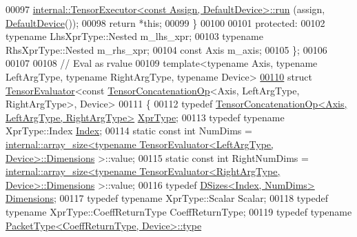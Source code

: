 \begin{DoxyCode}
00097       \hyperlink{class_eigen_1_1internal_1_1_tensor_executor}{internal::TensorExecutor<const Assign, DefaultDevice>::run}
      (assign, \hyperlink{struct_eigen_1_1_default_device}{DefaultDevice}());
00098       \textcolor{keywordflow}{return} *\textcolor{keyword}{this};
00099     \}
00100 
00101   \textcolor{keyword}{protected}:
00102     \textcolor{keyword}{typename} LhsXprType::Nested m\_lhs\_xpr;
00103     \textcolor{keyword}{typename} RhsXprType::Nested m\_rhs\_xpr;
00104     \textcolor{keyword}{const} Axis m\_axis;
00105 \};
00106 
00107 
00108 \textcolor{comment}{// Eval as rvalue}
00109 \textcolor{keyword}{template}<\textcolor{keyword}{typename} Axis, \textcolor{keyword}{typename} LeftArgType, \textcolor{keyword}{typename} RightArgType, \textcolor{keyword}{typename} Device>
\hyperlink{struct_eigen_1_1_tensor_evaluator_3_01const_01_tensor_concatenation_op_3_01_axis_00_01_left_arg_e37e1b61d31098a96aab7c22793b325c}{00110} \textcolor{keyword}{struct }\hyperlink{struct_eigen_1_1_tensor_evaluator}{TensorEvaluator}<const \hyperlink{class_eigen_1_1_tensor_concatenation_op}{TensorConcatenationOp}<Axis, LeftArgType, 
      RightArgType>, Device>
00111 \{
00112   \textcolor{keyword}{typedef} \hyperlink{class_eigen_1_1_tensor_concatenation_op}{TensorConcatenationOp<Axis, LeftArgType, RightArgType>}
       \hyperlink{class_eigen_1_1_tensor_concatenation_op}{XprType};
00113   \textcolor{keyword}{typedef} \textcolor{keyword}{typename} XprType::Index \hyperlink{namespace_eigen_a62e77e0933482dafde8fe197d9a2cfde}{Index};
00114   \textcolor{keyword}{static} \textcolor{keyword}{const} \textcolor{keywordtype}{int} NumDims = 
      \hyperlink{struct_eigen_1_1internal_1_1array__size}{internal::array\_size<typename TensorEvaluator<LeftArgType, Device>::Dimensions}
      >::value;
00115   \textcolor{keyword}{static} \textcolor{keyword}{const} \textcolor{keywordtype}{int} RightNumDims = 
      \hyperlink{struct_eigen_1_1internal_1_1array__size}{internal::array\_size<typename TensorEvaluator<RightArgType, Device>::Dimensions}
      >::value;
00116   \textcolor{keyword}{typedef} \hyperlink{struct_eigen_1_1_d_sizes}{DSizes<Index, NumDims>} \hyperlink{struct_eigen_1_1_d_sizes}{Dimensions};
00117   \textcolor{keyword}{typedef} \textcolor{keyword}{typename} XprType::Scalar Scalar;
00118   \textcolor{keyword}{typedef} \textcolor{keyword}{typename} XprType::CoeffReturnType CoeffReturnType;
00119   \textcolor{keyword}{typedef} \textcolor{keyword}{typename} \hyperlink{group___sparse_core___module}{PacketType<CoeffReturnType, Device>::type} 

\end{DoxyCode}
